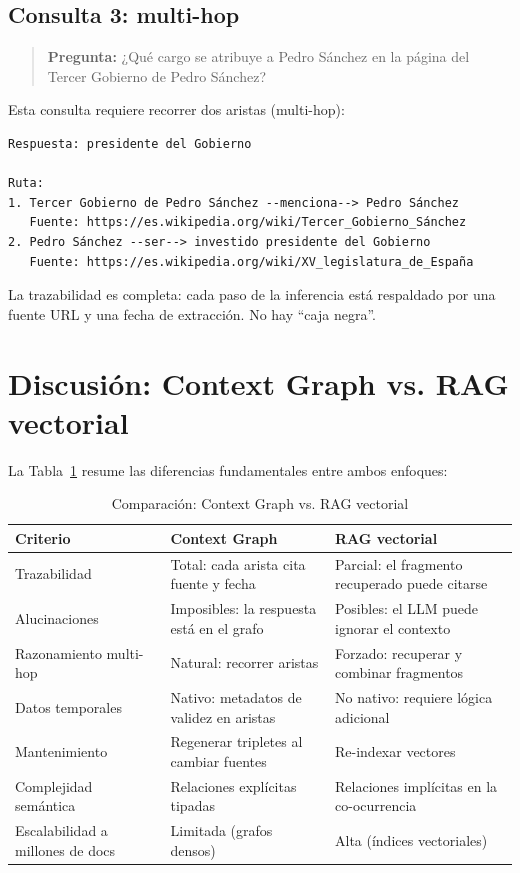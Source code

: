 \documentclass[12pt,a4paper]{article}
\begin{document}
\subsection{Consulta 3: multi-hop}
\label{q3}

\begin{quote}
\textbf{Pregunta:} ¿Qué cargo se atribuye a Pedro Sánchez en la página del Tercer Gobierno de Pedro Sánchez?
\end{quote}

Esta consulta requiere recorrer dos aristas (multi-hop):

\begin{lstlisting}
Respuesta: presidente del Gobierno

Ruta:
1. Tercer Gobierno de Pedro Sánchez --menciona--> Pedro Sánchez
   Fuente: https://es.wikipedia.org/wiki/Tercer_Gobierno_Sánchez
2. Pedro Sánchez --ser--> investido presidente del Gobierno
   Fuente: https://es.wikipedia.org/wiki/XV_legislatura_de_España
\end{lstlisting}

La trazabilidad es completa: cada paso de la inferencia está respaldado por una fuente URL y una fecha de extracción. No hay ``caja negra''.

\section{Discusión: Context Graph vs. RAG vectorial}
\label{sec:discusion}

La Tabla~\ref{tab:comparacion} resume las diferencias fundamentales entre ambos enfoques:

\begin{table}[H]
\centering
\caption{Comparación: Context Graph vs. RAG vectorial}
\label{tab:comparacion}
\begin{tabular}{lp{6cm}p{6cm}}
\toprule
\textbf{Criterio} & \textbf{Context Graph} & \textbf{RAG vectorial} \\
\midrule
Trazabilidad & Total: cada arista cita fuente y fecha & Parcial: el fragmento recuperado puede citarse \\
Alucinaciones & Imposibles: la respuesta está en el grafo & Posibles: el LLM puede ignorar el contexto \\
Razonamiento multi-hop & Natural: recorrer aristas & Forzado: recuperar y combinar fragmentos \\
Datos temporales & Nativo: metadatos de validez en aristas & No nativo: requiere lógica adicional \\
Mantenimiento & Regenerar tripletes al cambiar fuentes & Re-indexar vectores \\
Complejidad semántica & Relaciones explícitas tipadas & Relaciones implícitas en la co-ocurrencia \\
Escalabilidad a millones de docs & Limitada (grafos densos) & Alta (índices vectoriales) \\
\bottomrule
\end{tabular}
\end{table}
\end{document}
